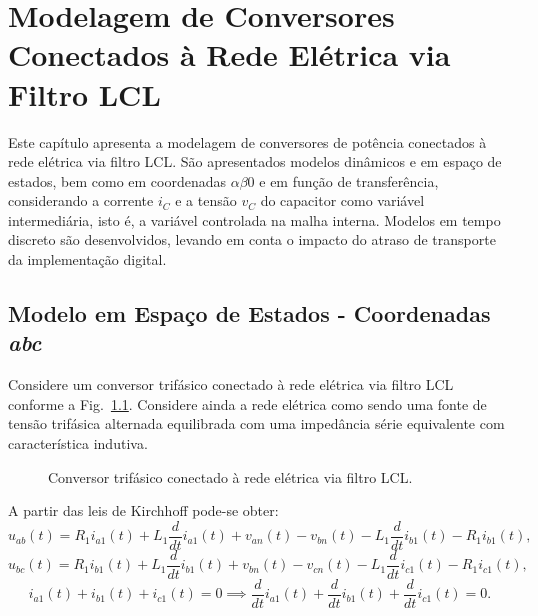 
\chapter{Modelagem de Conversores Conectados à Rede Elétrica via Filtro LCL}\label{modelagem}

	Este capítulo apresenta a modelagem de conversores de potência conectados à rede elétrica via filtro LCL. São apresentados modelos dinâmicos e em espaço de estados, bem como em coordenadas $\alpha \beta 0$ \cite{ref:JORGE} e em função de transferência, considerando a corrente $i_C$ e a tensão $v_C$ do capacitor como variável intermediária, isto é, a variável controlada na malha interna. Modelos em tempo discreto são desenvolvidos, levando em conta o impacto do atraso de transporte da implementação digital.


\section{Modelo em Espaço de Estados - Coordenadas \emph{abc}}

  Considere um conversor trifásico conectado à rede elétrica via filtro LCL conforme a Fig.~\ref{fig:inversor_conectado_na_rede}. Considere ainda a rede elétrica como sendo uma fonte de tensão trifásica alternada equilibrada com uma impedância série equivalente com característica indutiva.

  \begin{figure}[htb]
    \centering{
      \def\svgwidth{\textwidth}
      }
    \renewcommand\figurename{Fig.}
    \caption{Conversor trifásico conectado à rede elétrica via filtro LCL.}
    \label{fig:inversor_conectado_na_rede}
  \end{figure}

  A partir das leis de Kirchhoff pode-se obter:
  \begin{equation}
    u_{ab}(t) = R_1 i_{a1}(t) + L_1 \frac{d}{dt} i_{a1}(t) + v_{an}(t)
      - v_{bn}(t) - L_1 \frac{d}{dt} i_{b1}(t) - R_1 i_{b1}(t) \text{,}
  \end{equation}
  \begin{equation}
    u_{bc}(t) = R_1 i_{b1}(t) + L_1 \frac{d}{dt} i_{b1}(t) + v_{bn}(t)
      - v_{cn}(t) - L_1 \frac{d}{dt} i_{c1}(t) - R_1 i_{c1}(t) \text{,}
  \end{equation}
  \begin{equation}
    i_{a1}(t) + i_{b1}(t) + i_{c1}(t) = 0 \implies \frac{d}{dt} i_{a1}(t)
      + \frac{d}{dt} i_{b1}(t) + \frac{d}{dt} i_{c1}(t) = 0 \text{.}
  \end{equation}


